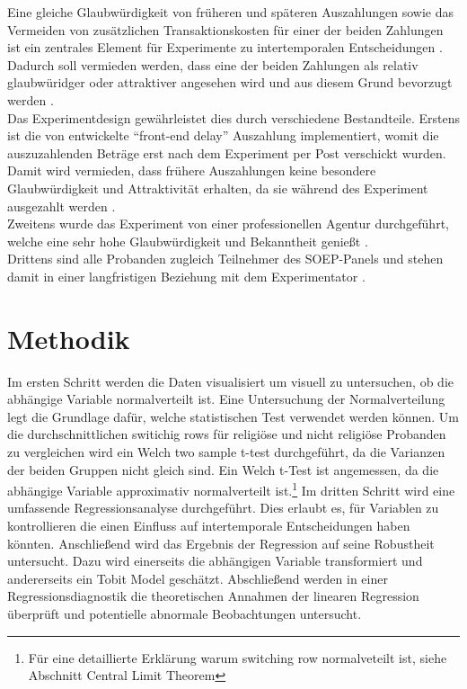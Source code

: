 \documentclass[11pt,a4paper]{article}
\begin{document}
Eine gleiche Glaubwürdigkeit von früheren und späteren Auszahlungen sowie das Vermeiden von zusätzlichen Transaktionskosten für einer der beiden Zahlungen ist ein zentrales Element für Experimente zu intertemporalen Entscheidungen \parencite{dohmen2012interpreting}. Dadurch soll vermieden werden, dass eine der beiden Zahlungen als relativ glaubwüridger oder attraktiver angesehen wird und aus diesem Grund bevorzugt werden \parencite{dohmen2012interpreting}.\\

Das Experimentdesign gewährleistet dies durch verschiedene Bestandteile. Erstens ist die von \textcite{coller1999eliciting} entwickelte  “front-end delay''  Auszahlung implementiert, womit die auszuzahlenden Beträge erst nach dem Experiment per Post verschickt wurden. Damit wird vermieden, dass frühere Auszahlungen keine besondere Glaubwürdigkeit und Attraktivität erhalten, da sie während des Experiment ausgezahlt werden \parencite{dohmen2012interpreting}.\\
Zweitens wurde das Experiment von einer professionellen Agentur durchgeführt, welche eine sehr hohe Glaubwürdigkeit und Bekanntheit genießt \parencite{dohmen2012interpreting}.\\
Drittens sind alle Probanden zugleich Teilnehmer des SOEP-Panels und stehen damit in einer langfristigen Beziehung mit dem Experimentator \parencite{dohmen2012interpreting}. 
 

\section{Methodik}
Im ersten Schritt werden die Daten visualisiert um visuell zu untersuchen, ob die abhängige Variable normalverteilt ist. Eine Untersuchung der Normalverteilung legt die Grundlage dafür, welche statistischen Test verwendet werden können. Um die durchschnittlichen switichig rows für religiöse und nicht religiöse Probanden zu vergleichen wird ein Welch two sample t-test durchgeführt, da die Varianzen der beiden Gruppen nicht gleich sind. Ein Welch t-Test ist angemessen, da die abhängige Variable approximativ normalverteilt ist.\footnote{Für eine detaillierte Erklärung warum switching row normalveteilt ist, siehe Abschnitt Central Limit Theorem} Im dritten Schritt wird eine umfassende Regressionsanalyse durchgeführt. Dies erlaubt es, für Variablen zu kontrollieren die einen Einfluss auf intertemporale Entscheidungen haben könnten. Anschließend wird das Ergebnis der Regression auf seine Robustheit untersucht. Dazu wird einerseits die abhängigen Variable transformiert und andererseits ein Tobit Model geschätzt. Abschließend werden in einer Regressionsdiagnostik die theoretischen Annahmen der linearen Regression überprüft und potentielle abnormale Beobachtungen untersucht. \\
\end{document}
